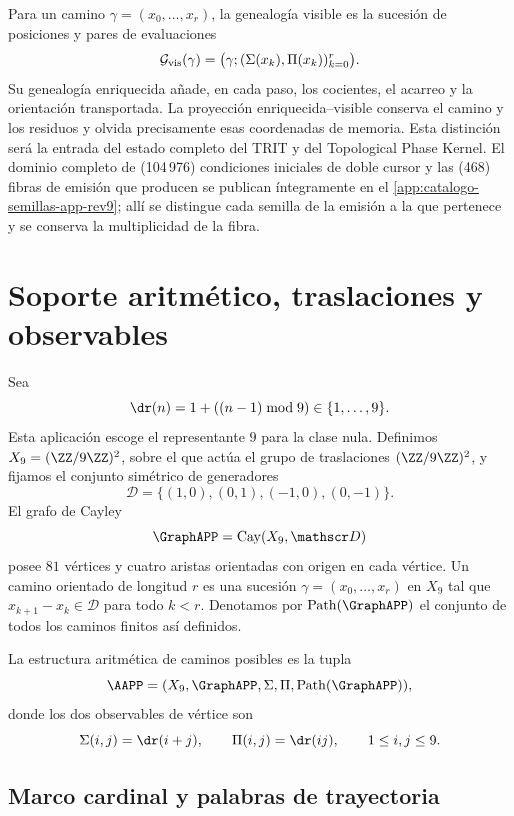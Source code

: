 Para un camino \(\gamma=(x_0,\ldots,x_r)\), la genealogía visible es la
sucesión de posiciones y pares de evaluaciones
\[
 \mathcal G_{\rm vis}(\gamma)
 =\bigl(\gamma;(\Sigma(x_k),\Pi(x_k))_{k=0}^{r}\bigr).
\]
Su genealogía enriquecida añade, en cada paso, los cocientes, el acarreo y
la orientación transportada. La proyección enriquecida--visible conserva el
camino y los residuos y olvida precisamente esas coordenadas de memoria. Esta
distinción será la entrada del estado completo del TRIT y del Topological Phase Kernel.
El dominio completo de (104\,976) condiciones iniciales de doble cursor y
las (468) fibras de emisión que producen se publican íntegramente en el
\cref{app:catalogo-semillas-app-rev9}; allí se distingue cada semilla de la
emisión a la que pertenece y se conserva la multiplicidad de la fibra.

\section{Soporte aritmético, traslaciones y observables}

Sea
\[
\dr(n)=1+((n-1)\bmod9)\in\{1,\ldots,9\}.
\]
Esta aplicación escoge el representante \(9\) para la clase nula. Definimos
\(X_9=(\ZZ/9\ZZ)^2\), sobre el que actúa el grupo de traslaciones
\((\ZZ/9\ZZ)^2\), y fijamos el conjunto simétrico de generadores
\[
 \mathscr D=\{(1,0),(0,1),(-1,0),(0,-1)\}.
\]
El grafo de Cayley
\[
 \GraphAPP=\operatorname{Cay}(X_9,\mathscr D)
\]
posee \(81\) vértices y cuatro aristas orientadas con origen en cada vértice.
Un camino orientado de longitud \(r\) es una sucesión
\(\gamma=(x_0,\ldots,x_r)\) en \(X_9\) tal que
\(x_{k+1}-x_k\in\mathscr D\) para todo \(k<r\). Denotamos por
\(\operatorname{Path}(\GraphAPP)\) el conjunto de todos los caminos finitos
así definidos.

\begin{definition}
La estructura aritmética de caminos posibles es la tupla
\[
 \AAPP=(X_9,\GraphAPP,\Sigma,\Pi,
        \operatorname{Path}(\GraphAPP)),
\]
donde los dos observables de vértice son
\[
\Sigma(i,j)=\dr(i+j),
\qquad
\Pi(i,j)=\dr(ij),
\qquad1\le i,j\le9.
\]
\end{definition}

\subsection*{Marco cardinal y palabras de trayectoria}

